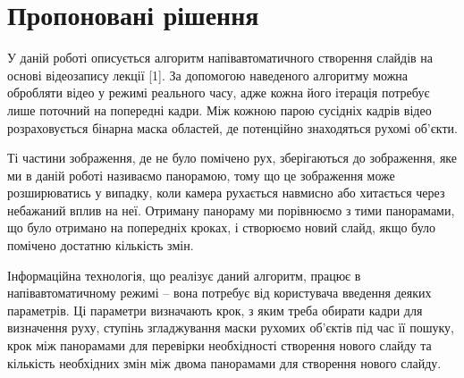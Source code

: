 \section{Пропоновані рішення}


У даній роботі описується алгоритм напівавтоматичного 
створення слайдів на основі відеозапису лекції [1].
За допомогою наведеного алгоритму можна обробляти відео 
у режимі реального часу, адже кожна його ітерація потребує 
лише поточний на попередні кадри. Між кожною парою 
сусідніх кадрів відео розраховується бінарна маска областей, де 
потенційно знаходяться рухомі об’єкти. 


Ті частини зображення, де не було помічено рух, зберігаються до 
зображення, яке ми в даній роботі називаємо панорамою, тому що 
це зображення може розширюватись у випадку, коли камера рухається 
навмисно або хитається через небажаний вплив на неї. 
Отриману панораму ми порівнюємо з тими панорамами, що було отримано на 
попередніх кроках, і створюємо новий слайд, якщо було помічено 
достатню кількість змін.


Інформаційна технологія, що реалізує даний алгоритм, працює в 
напівавтоматичному режимі – вона потребує від користувача введення 
деяких параметрів. 
Ці параметри визначають крок, з яким треба обирати кадри для визначення руху, 
ступінь згладжування маски рухомих об’єктів під час її пошуку, крок 
між панорамами для перевірки необхідності створення нового 
слайду та кількість необхідних змін між двома панорамами для створення нового слайду.



\usetikzlibrary{arrows,positioning,shapes}
\begin{figure}
\begin{center}
\end{center}
\end{figure}
